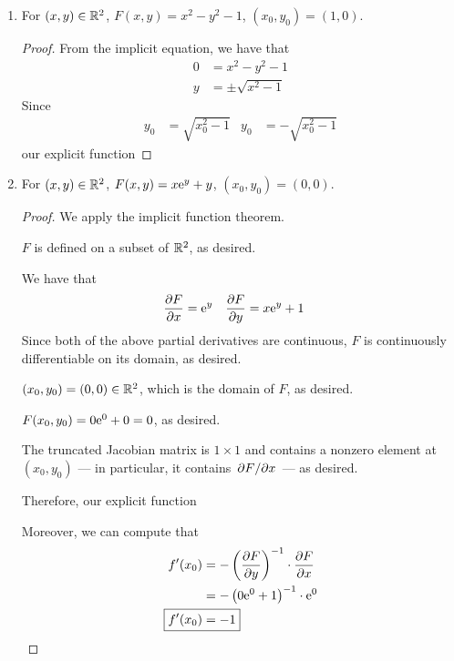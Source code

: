 \documentclass[../psets.tex]{subfiles}
\begin{document}
\begin{enumerate}
\begin{enumerate}
\begin{proof}
        \end{proof}
        \item For $(x,y)\in\R^2$, $F(x,y)=x^2-y^2-1$, $(x_0,y_0)=(1,0)$.
        \begin{proof}
            From the implicit equation, we have that
            \begin{align*}
                0 &= x^2-y^2-1\\
                y &= \pm\sqrt{x^2-1}
            \end{align*}
            Since
            \begin{align*}
                y_0 &= \sqrt{x_0^2-1}&
                y_0 &= -\sqrt{x_0^2-1}
            \end{align*}
            our explicit function 
        \end{proof}
        \item For $(x,y)\in\R^2$, $F(x,y)=x\e[y]+y$, $(x_0,y_0)=(0,0)$.
        \begin{proof}
            We apply the implicit function theorem.\par\smallskip
            $F$ is defined on a subset of $\R^2$, as desired.\par
            We have that
            \begin{align*}
                \pdv{F}{x} &= \e[y]&
                \pdv{F}{y} &= x\e[y]+1
            \end{align*}
            Since both of the above partial derivatives are continuous, $F$ is continuously differentiable on its domain, as desired.\par
            $(x_0,y_0)=(0,0)\in\R^2$, which is the domain of $F$, as desired.\par
            $F(x_0,y_0)=0\e[0]+0=0$, as desired.\par
            The truncated Jacobian matrix is $1\times 1$ and contains a nonzero element at $(x_0,y_0)$ --- in particular, it contains $\pdv*{F}{x}$ --- as desired.\par\smallskip
            Therefore, our explicit function \par\smallskip
            Moreover, we can compute that
            \begin{align*}
                f'(x_0) &= -\left( \pdv{F}{y}(x_0,y_0) \right)^{-1}\cdot\pdv{F}{x}(x_0,y_0)\\
                &= -\left( 0\e[0]+1 \right)^{-1}\cdot\e[0]\\
                \Aboxed{f'(x_0) &= -1}
            \end{align*}
        \end{proof}
    \end{enumerate}
\end{enumerate}
\end{document}
